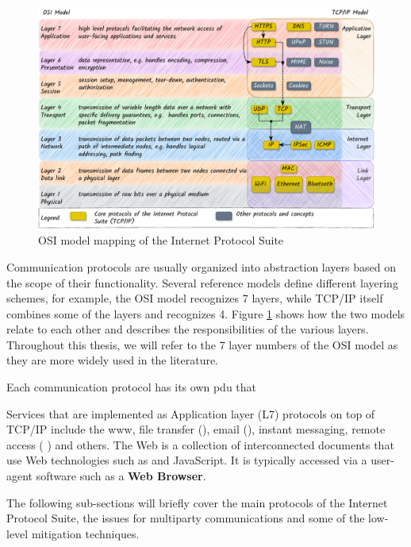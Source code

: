 \begin{figure}
\centering
\includegraphics[width=1\textwidth,height=\textheight]{thesis/../figures/osi-map-tcp.drawio.pdf}
\caption{OSI model mapping of the Internet Protocol
Suite\label{osi-map-tcp}}
\end{figure}

Communication protocols are usually organized into abstraction layers
based on the scope of their functionality. Several reference models
define different layering schemes, for example, the OSI model recognizes
7 layers, while TCP/IP itself combines some of the layers and recognizes
4. Figure \ref{osi-map-tcp} shows how the two models relate to each
other and describes the responsibilities of the various layers.
Throughout this thesis, we will refer to the 7 layer numbers of the OSI
model as they are more widely used in the literature.

Each communication protocol has its own \gls{pdu} that

Services that are implemented as Application layer (L7) protocols on top
of TCP/IP include the \gls{www}, file transfer
(), email (),
instant messaging, remote access (
\autocite{sshRFC}) and others. The Web is a collection of interconnected
documents that use Web technologies such as
 and JavaScript. It is typically accessed
via a user-agent software such as a \textbf{Web Browser}.

The following sub-sections will briefly cover the main protocols of the
Internet Protocol Suite, the issues for multiparty communications and
some of the low-level mitigation techniques.


